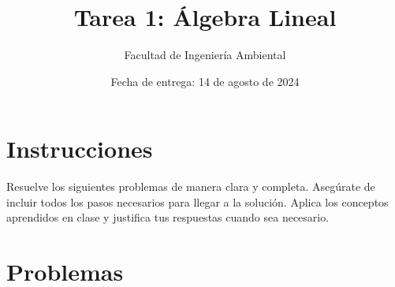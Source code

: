 \documentclass[a4paper, 12pt]{article}
\title{Tarea 1: Álgebra Lineal}
\author{Facultad de Ingeniería Ambiental}
\date{Fecha de entrega: 14 de agosto de 2024}
\begin{document}
\maketitle

\section*{Instrucciones}
Resuelve los siguientes problemas de manera clara y completa. Asegúrate de incluir todos los pasos necesarios para llegar a la solución. Aplica los conceptos aprendidos en clase y justifica tus respuestas cuando sea necesario.


\section*{Problemas}
\end{document}
